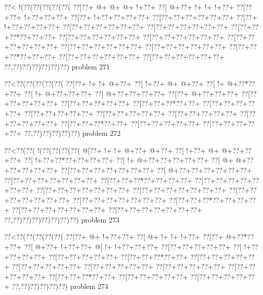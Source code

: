 \vbox{\vbox{\goo
\0??<\- !(\0??(\0??(\0??(\0??(\0??(
\0??[\0??+\- @+\- @+\- @+\- !+\0??+
\0??[\- @+\0??+\- !+\- !+\- !+\0??+
\0??[\0??+\0??+\- !+\0??+\0??+\0??+
\0??[\0??+\- !+\0??+\0??+\0??+\0??+
\0??[\0??+\0??+\0??+\0??+\0??+\0??+
\0??[\0??+\- !+\0??+\0??+\0??+\0??+
\0??[\0??+\0??+\0??+\0??+\0??+\0??+
\0??[\0??+\0??+\0??+\0??+\0??+\0??+
\0??[\0??+\0??+\0??*\0??+\0??+\0??+
\0??[\0??+\0??+\0??+\0??+\0??+\0??+
\0??[\0??+\0??+\0??+\0??+\0??+\0??+
\0??[\0??+\0??+\0??+\0??+\0??+\0??+
\0??[\0??+\0??+\0??+\0??+\0??+\0??+
\0??[\0??+\0??+\0??+\0??+\0??+\0??+
\0??[\0??+\0??+\0??*\0??+\0??+\0??+
\0??[\0??+\0??+\0??+\0??+\0??+\0??+
\0??[\0??+\0??+\0??+\0??+\0??+\0??+
\0??,\0??)\0??)\0??)\0??)\0??)\0??)
}
\hfil problem 271\hfil\break
}

\vbox{\vbox{\goo
\0??<\0??(\0??(\0??(\0??(\0??(
\0??[\0??+\- !+\- !+\- @+\0??+
\0??[\- !+\0??+\- @+\- @+\0??+
\0??[\- !+\- @+\0??*\0??+\0??+
\0??[\- !+\- @+\0??+\0??+\0??+
\0??[\- @+\0??+\0??+\0??+\0??+
\0??[\0??+\- @+\0??+\0??+\0??+
\0??[\0??+\0??+\0??+\0??+\0??+
\0??[\0??+\0??+\0??+\0??+\0??+
\0??[\0??+\0??+\0??*\0??+\0??+
\0??[\0??+\0??+\0??+\0??+\0??+
\0??[\0??+\0??+\0??+\0??+\0??+
\0??[\0??+\0??+\0??+\0??+\0??+
\0??[\0??+\0??+\0??+\0??+\0??+
\0??[\0??+\0??+\0??+\0??+\0??+
\0??[\0??+\0??+\0??*\0??+\0??+
\0??[\0??+\0??+\0??+\0??+\0??+
\0??[\0??+\0??+\0??+\0??+\0??+
\0??,\0??)\0??)\0??)\0??)\0??)
}
\hfil problem 272\hfil\break
}

\vbox{\vbox{\goo
\0??<\0??(\0??(\- !(\0??(\0??(\0??(\0??(
\- @[\0??+\- !+\- !+\- @+\0??+\- @+\0??+
\0??[\- !+\0??+\- @+\- @+\0??+\0??+\0??+
\0??[\- !+\0??+\0??*\0??+\0??+\0??+\0??+
\0??[\- !+\- @+\0??+\0??+\0??+\0??+\0??+
\0??[\- @+\- @+\0??+\0??+\0??+\0??+\0??+
\0??[\0??+\0??+\0??+\0??+\0??+\0??+\0??+
\0??[\- @+\0??+\0??+\0??+\0??+\0??+\0??+
\0??[\0??+\0??+\0??+\0??+\0??+\0??+\0??+
\0??[\0??+\0??+\0??*\0??+\0??+\0??+\0??+
\0??[\0??+\0??+\0??+\0??+\0??+\0??+\0??+
\0??[\0??+\0??+\0??+\0??+\0??+\0??+\0??+
\0??[\0??+\0??+\0??+\0??+\0??+\0??+\0??+
\0??[\0??+\0??+\0??+\0??+\0??+\0??+\0??+
\0??[\0??+\0??+\0??+\0??+\0??+\0??+\0??+
\0??[\0??+\0??+\0??*\0??+\0??+\0??+\0??+
\0??[\0??+\0??+\0??+\0??+\0??+\0??+\0??+
\0??[\0??+\0??+\0??+\0??+\0??+\0??+\0??+
\0??,\0??)\0??)\0??)\0??)\0??)\0??)\0??)
}
\hfil problem 273\hfil\break
}

\vbox{\vbox{\goo
\0??<\0??(\0??(\0??(\0??(\0??(
\0??[\0??+\- @+\- !+\0??+\0??+
\0??[\- @+\- !+\- !+\- !+\0??+
\0??[\0??+\- @+\0??*\0??+\0??+
\0??[\- @+\0??+\- !+\0??+\0??+
\- @[\- !+\- !+\0??+\0??+\0??+
\0??[\0??+\0??+\0??+\0??+\0??+
\0??[\- !+\0??+\0??+\0??+\0??+
\0??[\0??+\0??+\0??+\0??+\0??+
\0??[\0??+\0??+\0??*\0??+\0??+
\0??[\0??+\0??+\0??+\0??+\0??+
\0??[\0??+\0??+\0??+\0??+\0??+
\0??[\0??+\0??+\0??+\0??+\0??+
\0??[\0??+\0??+\0??+\0??+\0??+
\0??[\0??+\0??+\0??+\0??+\0??+
\0??[\0??+\0??+\0??*\0??+\0??+
\0??[\0??+\0??+\0??+\0??+\0??+
\0??[\0??+\0??+\0??+\0??+\0??+
\0??,\0??)\0??)\0??)\0??)\0??)
}
\hfil problem 274\hfil\break
}

